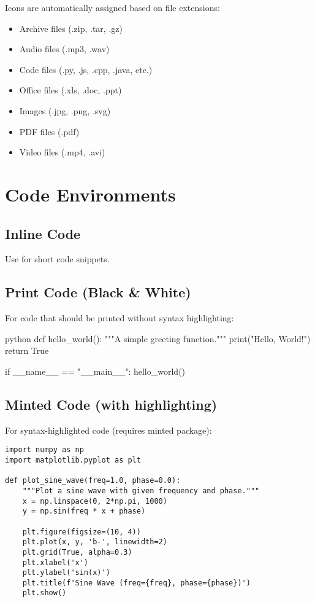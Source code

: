 \documentclass[11pt,letterpaper]{article}
\begin{document}
Icons are automatically assigned based on file extensions:
\begin{itemize}
    \item Archive files (.zip, .tar, .gz)
    \item Audio files (.mp3, .wav)
    \item Code files (.py, .js, .cpp, .java, etc.)
    \item Office files (.xls, .doc, .ppt)
    \item Images (.jpg, .png, .svg)
    \item PDF files (.pdf)
    \item Video files (.mp4, .avi)
\end{itemize}

\section{Code Environments}

\subsection{Inline Code}

Use  for short code snippets.

\subsection{Print Code (Black \& White)}

For code that should be printed without syntax highlighting:

\begin{ptprintcode}{python}
    def hello_world():
    """A simple greeting function."""
    print("Hello, World!")
    return True

    if __name__ == "__main__":
    hello_world()
\end{ptprintcode}

\subsection{Minted Code (with highlighting)}

For syntax-highlighted code (requires minted package):

\begin{verbatim}
import numpy as np
import matplotlib.pyplot as plt

def plot_sine_wave(freq=1.0, phase=0.0):
    """Plot a sine wave with given frequency and phase."""
    x = np.linspace(0, 2*np.pi, 1000)
    y = np.sin(freq * x + phase)
    
    plt.figure(figsize=(10, 4))
    plt.plot(x, y, 'b-', linewidth=2)
    plt.grid(True, alpha=0.3)
    plt.xlabel('x')
    plt.ylabel('sin(x)')
    plt.title(f'Sine Wave (freq={freq}, phase={phase})')
    plt.show()
\end{verbatim}
\end{document}
